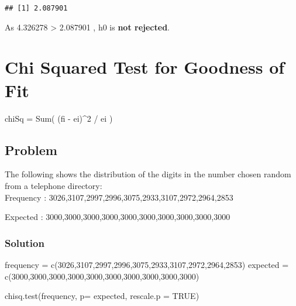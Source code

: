 \documentclass[
]{article}
\newenvironment{Shaded}{\begin{snugshade}}{\end{snugshade}}
\newcommand{\AttributeTok}[1]{\textcolor[rgb]{0.77,0.63,0.00}{#1}}
\newcommand{\ConstantTok}[1]{\textcolor[rgb]{0.00,0.00,0.00}{#1}}
\newcommand{\DecValTok}[1]{\textcolor[rgb]{0.00,0.00,0.81}{#1}}
\newcommand{\FunctionTok}[1]{\textcolor[rgb]{0.00,0.00,0.00}{#1}}
\newcommand{\NormalTok}[1]{#1}
\newcommand{\OtherTok}[1]{\textcolor[rgb]{0.56,0.35,0.01}{#1}}
\begin{document}
\begin{verbatim}
## [1] 2.087901
\end{verbatim}

As 4.326278 \textgreater{} 2.087901 , h0 is \textbf{not rejected}.

\hypertarget{chi-squared-test-for-goodness-of-fit}{%
\section{Chi Squared Test for Goodness of
Fit}\label{chi-squared-test-for-goodness-of-fit}}

chiSq = Sum( (fi - ei)\^{}2 / ei )

\hypertarget{problem-21}{%
\subsection{Problem}\label{problem-21}}

The following shows the distribution of the digits in the number chosen
random from a telephone directory:\\
Frequency : 3026,3107,2997,2996,3075,2933,3107,2972,2964,2853

Expected : 3000,3000,3000,3000,3000,3000,3000,3000,3000,3000

\hypertarget{solution-24}{%
\subsubsection{Solution}\label{solution-24}}

\begin{Shaded}
\begin{Highlighting}[]
\NormalTok{frequency }\OtherTok{=} \FunctionTok{c}\NormalTok{(}\DecValTok{3026}\NormalTok{,}\DecValTok{3107}\NormalTok{,}\DecValTok{2997}\NormalTok{,}\DecValTok{2996}\NormalTok{,}\DecValTok{3075}\NormalTok{,}\DecValTok{2933}\NormalTok{,}\DecValTok{3107}\NormalTok{,}\DecValTok{2972}\NormalTok{,}\DecValTok{2964}\NormalTok{,}\DecValTok{2853}\NormalTok{)}
\NormalTok{expected }\OtherTok{=} \FunctionTok{c}\NormalTok{(}\DecValTok{3000}\NormalTok{,}\DecValTok{3000}\NormalTok{,}\DecValTok{3000}\NormalTok{,}\DecValTok{3000}\NormalTok{,}\DecValTok{3000}\NormalTok{,}\DecValTok{3000}\NormalTok{,}\DecValTok{3000}\NormalTok{,}\DecValTok{3000}\NormalTok{,}\DecValTok{3000}\NormalTok{,}\DecValTok{3000}\NormalTok{)}


\FunctionTok{chisq.test}\NormalTok{(frequency, }\AttributeTok{p=}\NormalTok{ expected, }\AttributeTok{rescale.p =} \ConstantTok{TRUE}\NormalTok{)}
\end{Highlighting}
\end{Shaded}
\end{document}
